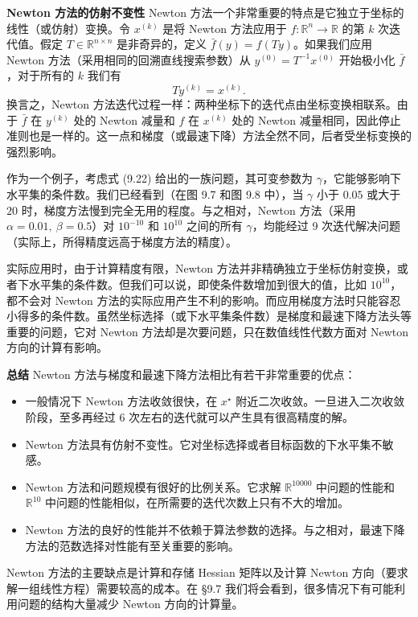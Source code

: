 \documentclass[UTF8, 12pt, fontset=fandol, oneside]{ctexart}
\begin{document}
\noindent\textbf{Newton 方法的仿射不变性}\quad
Newton 方法一个非常重要的特点是它独立于坐标的线性（或仿射）变换。令 $x^{(k)}$ 是将 Newton 方法应用于 $f:\mathbb{R}^n\to\mathbb{R}$ 的第 $k$ 次迭代值。假定 $T\in\mathbb{R}^{n\times n}$ 是非奇异的，定义 $\bar{f}(y)=f(Ty)$。如果我们应用 Newton 方法（采用相同的回溯直线搜索参数）从 $y^{(0)}=T^{-1}x^{(0)}$ 开始极小化 $\bar{f}$，对于所有的 $k$ 我们有
\[
Ty^{(k)}=x^{(k)}.
\]
换言之，Newton 方法迭代过程一样：两种坐标下的迭代点由坐标变换相联系。由于 $\bar{f}$ 在 $y^{(k)}$ 处的 Newton 减量和 $f$ 在 $x^{(k)}$ 处的 Newton 减量相同，因此停止准则也是一样的。这一点和梯度（或最速下降）方法全然不同，后者受坐标变换的强烈影响。

作为一个例子，考虑式 (9.22) 给出的一族问题，其可变参数为 $\gamma$，它能够影响下水平集的条件数。我们已经看到（在图 9.7 和图 9.8 中），当 $\gamma$ 小于 $0.05$ 或大于 $20$ 时，梯度方法慢到完全无用的程度。与之相对，Newton 方法（采用 $\alpha=0.01,\ \beta=0.5$）对 $10^{-10}$ 和 $10^{10}$ 之间的所有 $\gamma$，均能经过 9 次迭代解决问题（实际上，所得精度远高于梯度方法的精度）。

实际应用时，由于计算精度有限，Newton 方法并非精确独立于坐标仿射变换，或者下水平集的条件数。但我们可以说，即使条件数增加到很大的值，比如 $10^{10}$，都不会对 Newton 方法的实际应用产生不利的影响。而应用梯度方法时只能容忍小得多的条件数。虽然坐标选择（或下水平集条件数）是梯度和最速下降方法头等重要的问题，它对 Newton 方法却是次要问题，只在数值线性代数方面对 Newton 方向的计算有影响。

\noindent\textbf{总结}\quad
Newton 方法与梯度和最速下降方法相比有若干非常重要的优点：
\begin{itemize}
\item 一般情况下 Newton 方法收敛很快，在 $x^\star$ 附近二次收敛。一旦进入二次收敛阶段，至多再经过 6 次左右的迭代就可以产生具有很高精度的解。
\item Newton 方法具有仿射不变性。它对坐标选择或者目标函数的下水平集不敏感。
\item Newton 方法和问题规模有很好的比例关系。它求解 $\mathbb{R}^{10000}$ 中问题的性能和 $\mathbb{R}^{10}$ 中问题的性能相似，在所需要的迭代次数上只有不大的增加。
\item Newton 方法的良好的性能并不依赖于算法参数的选择。与之相对，最速下降方法的范数选择对性能有至关重要的影响。
\end{itemize}

Newton 方法的主要缺点是计算和存储 Hessian 矩阵以及计算 Newton 方向（要求解一组线性方程）需要较高的成本。在 \S9.7 我们将会看到，很多情况下有可能利用问题的结构大量减少 Newton 方向的计算量。
\end{document}
